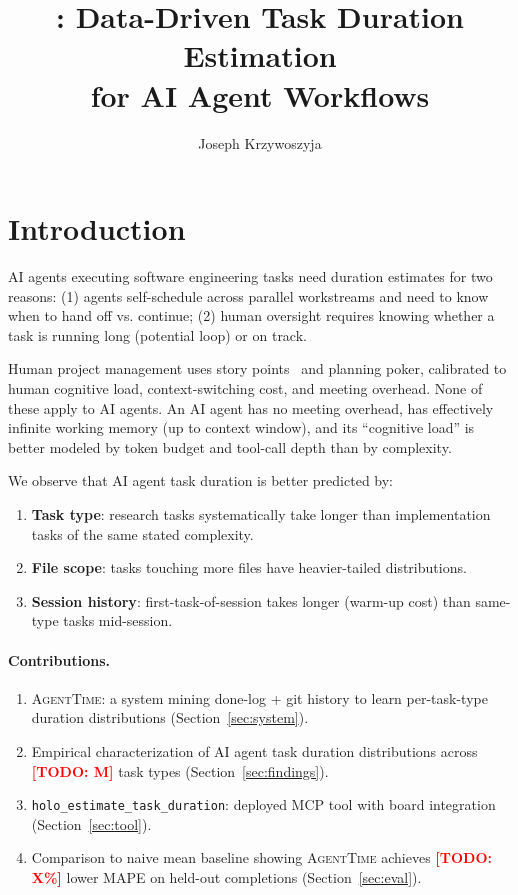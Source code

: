 \documentclass[sigconf]{acmart}
\title{\agenttime{}: Data-Driven Task Duration Estimation\\for AI Agent Workflows}
\author{Joseph Krzywoszyja}
\affiliation{\institution{HoloScript AI Lab}}
\newcommand{\todo}[1]{\textcolor{red}{\textbf{[TODO: #1]}}}
\newcommand{\agenttime}{\textsc{AgentTime}}
\begin{document}
\maketitle

\section{Introduction}

AI agents executing software engineering tasks need duration estimates for
two reasons: (1) agents self-schedule across parallel workstreams and need
to know when to hand off vs. continue; (2) human oversight requires
knowing whether a task is running long (potential loop) or on track.

Human project management uses story points~\cite{cohn2005} and planning
poker, calibrated to human cognitive load, context-switching cost, and
meeting overhead.
None of these apply to AI agents.
An AI agent has no meeting overhead, has effectively infinite working memory
(up to context window), and its ``cognitive load'' is better modeled by
token budget and tool-call depth than by complexity.

We observe that AI agent task duration is better predicted by:
\begin{enumerate}[leftmargin=*,topsep=2pt,itemsep=1pt]
  \item \textbf{Task type}: research tasks systematically take longer than
        implementation tasks of the same stated complexity.
  \item \textbf{File scope}: tasks touching more files have heavier-tailed
        distributions.
  \item \textbf{Session history}: first-task-of-session takes longer
        (warm-up cost) than same-type tasks mid-session.
\end{enumerate}

\paragraph{Contributions.}
\begin{enumerate}[leftmargin=*,topsep=2pt,itemsep=1pt]
  \item \agenttime{}: a system mining done-log + git history to learn
        per-task-type duration distributions (Section~\ref{sec:system}).
  \item Empirical characterization of AI agent task duration distributions
        across \todo{M} task types (Section~\ref{sec:findings}).
  \item \texttt{holo\_estimate\_task\_duration}: deployed MCP tool with
        board integration (Section~\ref{sec:tool}).
  \item Comparison to naive mean baseline showing \agenttime{} achieves
        \todo{X\%} lower MAPE on held-out completions (Section~\ref{sec:eval}).
\end{enumerate}
\end{document}

